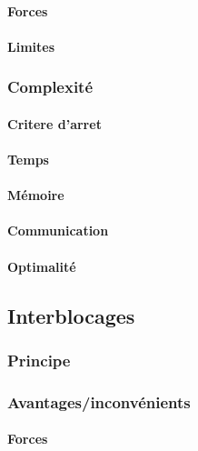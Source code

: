 \documentclass[a4paper, 10pt]{article}
\begin{document}
\paragraph{Forces}

\paragraph{Limites}

\subsubsection{Complexité}

\paragraph{Critere d'arret}

\paragraph{Temps}

\paragraph{Mémoire}

\paragraph{Communication}

\paragraph{Optimalité}

\subsection{Interblocages}

\subsubsection{Principe}

\subsubsection{Avantages/inconvénients}

\paragraph{Forces}
\end{document}
